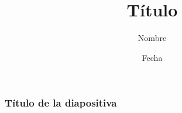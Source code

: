 \documentclass{beamer}
\title{Título}
\author{Nombre}
\institute{Universidad}
\date{Fecha}
\begin{document}
    \frame{\frametitle} %
    \begin{frame}
        \frametitle{Título de la diapositiva}
    \end{frame}
\end{document}
